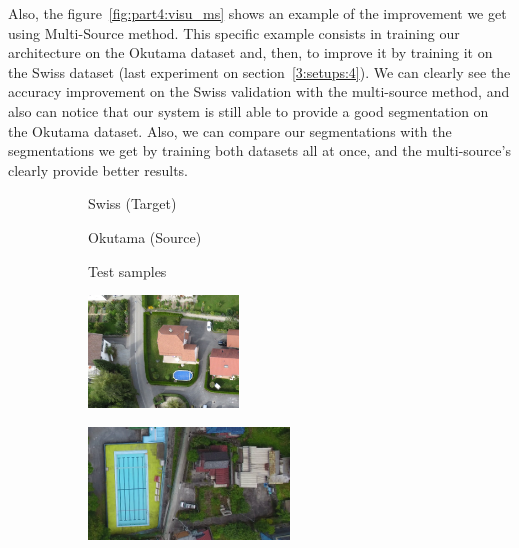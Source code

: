 Also, the figure~\ref{fig:part4:visu_ms} shows an example of the improvement we get using Multi-Source method. This specific example consists in training our architecture on the Okutama dataset and, then, to improve it by training it on the Swiss dataset (last experiment on section~\ref{3:setups:4}). We can clearly see the accuracy improvement on the Swiss validation with the multi-source method, and also can notice that our system is still able to provide a good segmentation on the Okutama dataset. Also, we can compare our segmentations with the segmentations we get by training both datasets all at once, and the multi-source's clearly provide better results.

\begin{figure}[ht!]
  \centering
  \begin{subfigure}[c]{0.20\textwidth}
    \centering 
  \end{subfigure}
  \begin{subfigure}[c]{0.33\textwidth}
    \centering Swiss (Target)
  \end{subfigure}
  \begin{subfigure}[c]{0.45\textwidth}
    \centering Okutama (Source)
  \end{subfigure}
  \vspace{0.2cm}
  
  \begin{subfigure}[c]{0.20\textwidth}
    \centering Test samples
  \end{subfigure}
  \begin{subfigure}[c]{0.33\textwidth}
    \includegraphics[height=3cm]{images/part4/swi_img.png}
  \end{subfigure}
  \begin{subfigure}[c]{0.45\textwidth}
    \includegraphics[height=3cm]{images/part4/oku_img.png}
  \end{subfigure}
  \vspace{0.1cm}
  

\end{figure}
